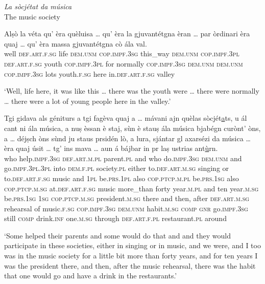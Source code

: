 \medskip

\textit{La sòcjétat da música}\\
The music society\\
\medskip

\begin{linenumbers}
\gll    Alṣò la véta qu' èra quèluisa … qu’ èra la gjuvantétgna èran … par òrdinari èra quaj … qu’ èra massa gjuvantétgna cò ála val. \\
 well \textsc{def.art.f.sg} life \textsc{dem.unm} \textsc{cop.impf.3sg} this\_way {} \textsc{dem.unm} \textsc{cop.impf.3pl} \textsc{def.art.f.sg} youth \textsc{cop.impf.3pl} {} for normally \textsc{cop.impf.3sg} \textsc{dem.unm} {} \textsc{dem.unm} \textsc{cop.impf.3sg} lots youth.\textsc{f.sg}  here in.\textsc{def.art.f.sg} valley\\
\end{linenumbers}
\medskip
\glt `Well, life here, it was like this … there was the youth were … there were normally … there were a lot of young people here in the valley.'
\medskip

\begin{linenumbers}
\gll    Tgi gidava als géniturs a tgi fagèva quaj a … mávani ajn quèlas sòcjét\underline{a}ts, u ál cant ni ála música, a nuṣ èssan è staj, sùn è stauṣ ála música bjabégn curònt' òns, a … déjṣch òns sùnd ju staus prsidén lò, a lura, sjántar gl axarsézi da música … èra quaj úsit … tg’ ins mava … aun á bájbar in pr laṣ ustrias ant\underline{ù}rn.\\
who help.\textsc{impf.3sg} \textsc{def.art.m.pl} parent.\textsc{pl} and who do.\textsc{impf.3sg}  \textsc{dem.unm} and {} go.\textsc{impf.3pl.3pl} into \textsc{dem.f.pl} society.\textsc{pl} either  to.\textsc{def.art.m.sg} singing or to.\textsc{def.art.f.sg} music and \textsc{1pl} be.\textsc{prs.1pl} also \textsc{cop.ptcp.m.pl} be.\textsc{prs.1sg} also \textsc{cop.ptcp.m.sg} at.\textsc{def.art.f.sg} music more\_than forty year.\textsc{m.pl} and {} ten year.\textsc{m.sg} be.\textsc{prs.1sg} \textsc{1sg} \textsc{cop.ptcp.m.sg} president.\textsc{m.sg} there and then, after \textsc{def.art.m.sg} rehearsal of music.\textsc{f.sg} {} \textsc{cop.impf.3sg} \textsc{dem.unm} habit.\textsc{m.sg} {} \textsc{comp} \textsc{gnr} go.\textsc{impf.3sg} {} still \textsc{comp} drink.\textsc{inf} one.\textsc{m.sg} through \textsc{def.art.f.pl} restaurant.\textsc{pl} around\\
\end{linenumbers}
\medskip
\glt `Some helped their parents and some would do that and and they would participate in these societies, either in singing or in music, and we were, and I too was in the music society for a little bit more than forty years, and for ten years I was the president there, and then, after the music rehearsal, there was the habit that one would go and have a drink in the restaurants.'
\medskip

